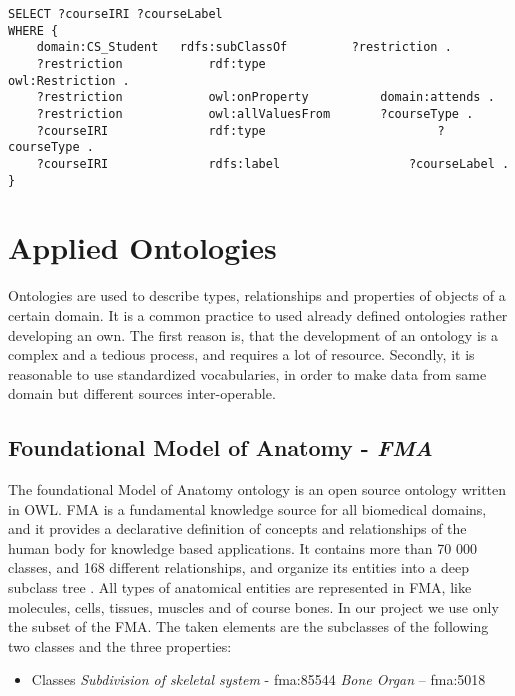 \begin{lstlisting}[captionpos=b, caption=SPARQL Query III., label=3rd:sparql, belowskip=1em, aboveskip=2em,
basicstyle=\footnotesize,frame=single]
SELECT ?courseIRI ?courseLabel
WHERE {
	domain:CS_Student	rdfs:subClassOf			?restriction .
	?restriction			rdf:type						owl:Restriction .
	?restriction			owl:onProperty			domain:attends .
	?restriction			owl:allValuesFrom		?courseType .
	?courseIRI				rdf:type						?courseType .
	?courseIRI				rdfs:label					?courseLabel . 
}
\end{lstlisting}


\newpage
\section{Applied Ontologies} \label{22}

Ontologies are used to describe types, relationships and properties of objects of a certain domain. It is a common practice to used already defined 
ontologies rather developing an own. The first reason is, that the development of an ontology is a complex and a tedious process, and requires a lot of resource. Secondly, it is reasonable to use standardized vocabularies, in order to make data from same domain but different sources inter-operable.

\subsection{Foundational Model of Anatomy - \textit{FMA}}  \label{fma}

The foundational Model of Anatomy ontology is an open source ontology written in OWL. FMA is a fundamental knowledge source for all biomedical domains, and it provides a declarative definition of concepts and relationships of the human body for knowledge based applications. It contains more than 70 000 classes, and 168 different relationships, and organize its entities into a deep subclass tree \cite{Rosse2003478}. All types of anatomical entities are represented in FMA, like molecules, cells, tissues, muscles and of course bones. In our project we use only the subset of the FMA. The taken elements are the subclasses of the following two classes and the three properties: 

\begin{itemize}
	\item{Classes}
		\subitem \textit{Subdivision of skeletal system} - fma:85544 
		\subitem \textit{Bone Organ} – fma:5018
\end{itemize}

